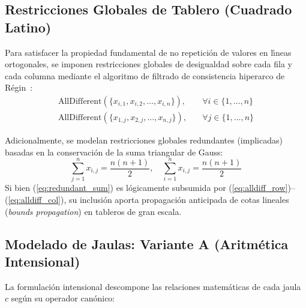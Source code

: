 \subsection{Restricciones Globales de Tablero (Cuadrado Latino)}
Para satisfacer la propiedad fundamental de no repetici\'on de valores en l\'{\i}neas ortogonales, se imponen restricciones globales de desigualdad sobre cada fila y cada columna mediante el algoritmo de filtrado de consistencia hiperarco de R\'egin~\cite{regin1994filtering}:
\begin{align}
    \text{AllDifferent}(\{x_{i,1}, x_{i,2}, \dots, x_{i,n}\}), & \quad \forall i \in \{1, \dots, n\} \label{eq:alldiff_row} \\
    \text{AllDifferent}(\{x_{1,j}, x_{2,j}, \dots, x_{n,j}\}), & \quad \forall j \in \{1, \dots, n\} \label{eq:alldiff_col}
\end{align}

Adicionalmente, se modelan restricciones globales redundantes (implicadas) basadas en la conservaci\'on de la suma triangular de Gauss:
\begin{equation}
    \sum_{j=1}^n x_{i,j} = \frac{n(n+1)}{2}, \quad \sum_{i=1}^n x_{i,j} = \frac{n(n+1)}{2}
    \label{eq:redundant_sum}
\end{equation}
Si bien (\ref{eq:redundant_sum}) es l\'ogicamente subsumida por (\ref{eq:alldiff_row})--(\ref{eq:alldiff_col}), su inclusi\'on aporta propagaci\'on anticipada de cotas lineales (\textit{bounds propagation}) en tableros de gran escala.

\subsection{Modelado de Jaulas: Variante A (Aritm\'etica Intensional)}
La formulaci\'on intensional descompone las relaciones matem\'aticas de cada jaula $c$ seg\'un su operador can\'onico:

